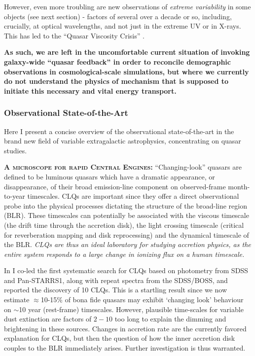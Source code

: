 \smallskip 
\smallskip
\noindent
However, even more troubling are new observations of {\it extreme
variability} in some objects (see next section) - factors of several
over a decade or so, including, crucially, at optical wavelengths, and
not just in the extreme UV or in X-rays. This has led to the ``Quasar
Viscosity Crisis'' \citep{Lawrence2018}.

\smallskip 
\smallskip
\noindent
{\bf As such, we are left in the uncomfortable current situation of
invoking galaxy-wide ``quasar feedback'' in order to reconcile
demographic observations in cosmological-scale simulations, but where
we currently do not understand the physics of mechanism that is
supposed to initiate this necessary and vital energy transport.}


\subsubsection{Observational State-of-the-Art}
Here I present a concise overview of the observational
state-of-the-art in the brand new field of variable extragalactic
astrophysics, concentrating on quasar studies.

\smallskip
\smallskip
\noindent
\textbf{\textsc{A microscope for rapid Central Engines:}}
``Changing-look'' quasars \citep[CLQs; ][]{LaMassa2015,
Runnoe2016, Ruan2016, Runco2016, MacLeod2016, Yang2017} 
are defined to be luminous quasars which have a
dramatic appearance, or disappearance, of their broad emission-line
component on observed-frame month-to-year timescales.  CLQs are
important since they offer a direct observational probe into the
physical processes dictating the structure of the broad-line region
(BLR). These timescales can potentially be associated with the viscous
timescale (the drift time through the accretion disk), the light
crossing timescale (critical for reverberation mapping and disk
reprocessing) and the dynamical timescale of the BLR.  {\it CLQs are thus
an ideal laboratory for studying accretion physics, as the entire
system responds to a large change in ionizing flux on a human
timescale.}

\smallskip 
\smallskip
\noindent 
In \citet{MacLeod2016} I co-led the first systematic search for CLQs
based on photometry from SDSS and Pan-STARRS1, along with repeat
spectra from the SDSS/BOSS, and reported the discovery of 10
CLQs. This is a startling result since we now estimate
$\approx$10-15\% of bona fide quasars may exhibit `changing look'
behaviour on $\sim$10 year (rest-frame) timescales. However, plausible
time-scales for variable dust extinction are factors of $2-10$ too
long to explain the dimming and brightening in these sources.  Changes
in accretion rate are the currently favored explanation for CLQs, but
then the question of how the inner accretion disk couples to the BLR
immediately arises. Further investigation is thus warranted.

